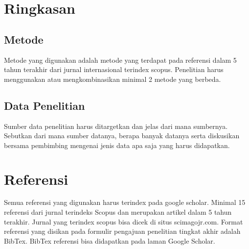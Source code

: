 \section{Ringkasan}
\subsection{Metode}
Metode yang digunakan adalah metode yang terdapat pada referensi dalam 5 tahun terakhir dari jurnal internasional terindex scopus. Penelitian harus menggunakan atau mengkombinasikan minimal 2 metode yang berbeda.

\subsection{Data Penelitian}
Sumber data penelitian harus ditargetkan dan jelas dari mana sumbernya. Sebutkan dari mana sumber datanya, berapa banyak datanya serta diskusikan bersama pembimbing mengenai jenis data apa saja yang harus didapatkan. 

\section{Referensi}
Semua referensi yang digunakan harus terindex pada google scholar. Minimal 15 referensi dari jurnal terindeks Scopus dan merupakan artikel dalam 5 tahun terakhir. Jurnal yang terindex scopus bisa dicek di situs scimagojr.com. Format referensi yang disikan pada formulir pengajuan penelitian tingkat akhir adalah BibTex. BibTex referensi bisa didapatkan pada laman Google Scholar.



